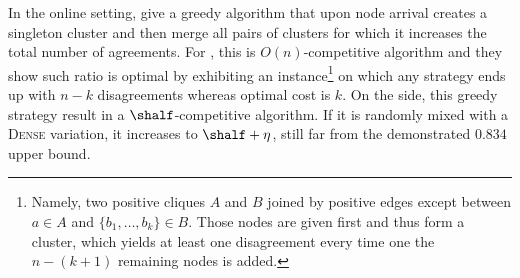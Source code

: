 In the online setting, \textcite{greedyOnline10} give a greedy algorithm that upon node arrival creates a
singleton cluster and then merge all pairs of clusters for which it increases the total number of
agreements. For \mind{}, this is $O(n)$-competitive algorithm and they show such ratio is optimal by
exhibiting an instance\footnote{Namely, two positive cliques $A$ and $B$ joined by positive edges except
between $a\in A$ and $\{b_1,\ldots, b_k\}\in B$. Those nodes are given first and thus form a cluster,
which yields at least one disagreement every time one the $n-(k+1)$ remaining nodes is added.} on
which any strategy ends up with $n - k$ disagreements whereas optimal cost is $k$. On the \maxa{}
side, this greedy strategy result in a $\shalf$-competitive algorithm. If it is randomly mixed with a
\textsc{Dense} variation, it increases to $\shalf+\eta$, still far from the demonstrated $0.834$ upper
bound.

\bigskip

